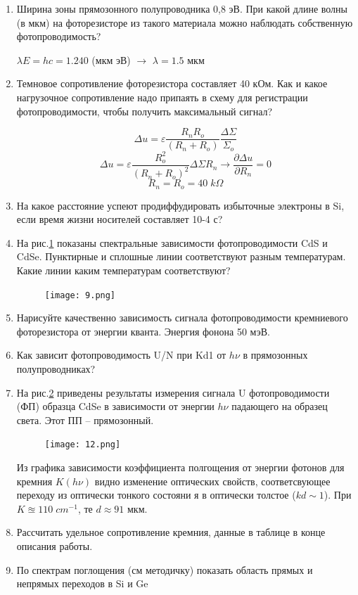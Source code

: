 \documentclass[a4paper,12pt]{report}
\begin{document}
\begin{enumerate}
    \item Ширина зоны прямозонного полупроводника 0,8 эВ. При какой длине волны (в мкм) на фоторезисторе из такого материала можно наблюдать собственную  фотопроводимость? \par 
    $\lambda E = hc = 1.240$ (мкм эВ) $\longrightarrow$ $\lambda = 1.5$ мкм

    \item Темновое сопротивление фоторезистора составляет 40 кОм. Как и какое нагрузочное сопротивление надо припаять в схему для регистрации фотопроводимости, чтобы получить максимальный сигнал? \par 
    $$\Delta u = \varepsilon \frac{R_n R_o}{(R_n + R_o)} \frac{\Delta \Sigma}{\Sigma_o}$$
    $$\Delta u = \varepsilon \frac{R_o^2}{(R_n + R_o)^2} \Delta \Sigma R_n \rightarrow \frac{\partial \Delta u}{\partial R_n} = 0$$
    $$R_n = R_o = 40\; k\Omega$$

    \item На какое расстояние успеют продиффудировать избыточные электроны в Si, если время жизни носителей составляет 10-4 с? \par 
    

    \item На рис.\ref{9} показаны спектральные зависимости фотопроводимости CdS  и CdSe. Пунктирные и сплошные линии соответствуют разным температурам. Какие линии  каким температурам соответствуют? \par 
    \begin{figure}[H]
        \centering
        \texttt{[image: 9.png]}
        \caption{}
        \label{9}
    \end{figure} 

    \item Нарисуйте качественно зависимость сигнала фотопроводимости кремниевого фоторезистора от энергии кванта. Энергия фонона  50 мэВ. \par 

    \item Как зависит фотопроводимость U/N при Kd1 от $h \nu$ в прямозонных полупроводниках? \par 

    \item  На рис.\ref{12} приведены результаты измерения сигнала  U фотопроводимости (ФП) образца CdSe  в зависимости от энергии $h \nu$ падающего на образец света. Этот ПП – прямозонный. \par 
    \begin{figure}[H]
        \centering
        \texttt{[image: 12.png]}
        \caption{}
        \label{12}
    \end{figure} 
    Из графика зависимости коэффициента полгощения от энергии фотонов для кремния $K(h \nu)$ видно изменение оптических свойств, соответсвующее переходу из оптически тонкого состояни я в оптически толстое ($kd \sim 1$). При $K \approxeq 110\; cm^{-1}$, те $d \approx 91$ мкм.
    \item Рассчитать удельное сопротивление кремния, данные в таблице в конце описания работы. 
    \item По спектрам поглощения (см методичку) показать область прямых и непрямых переходов в Si и Ge 

\end{enumerate}
\end{document}
